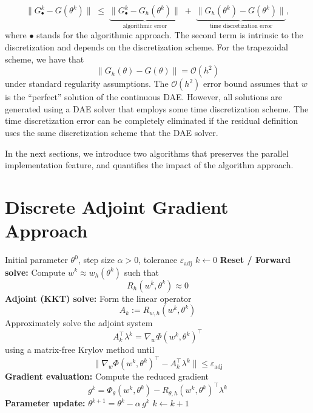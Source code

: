 \[
\|G_\bullet^k - G(\theta^k)\|
\;\le\;
\underbrace{\|G_\bullet^k - G_h(\theta^k)\|}_{\text{algorithmic error}}
\;+\;
\underbrace{\|G_h(\theta^k)-G(\theta^k)\|}_{\text{time discretization error}},
\]
where $\bullet$ stands for the algorithmic approach.
The second term is intrinsic to the discretization and depends on the discretization scheme. For the trapezoidal scheme, we have that 
\[
\|G_h(\theta)-G(\theta)\| = \mathcal{O}(h^2)
\]
under standard regularity assumptions. The $\mathcal{O}(h^2)$ error bound assumes that $w$ is the ``perfect'' solution of the continuous DAE. However, all solutions are generated using a DAE solver that employs some time discretization scheme. The time discretization error can be completely eliminated if the residual definition uses the same discretization scheme that the DAE solver.

In the next sections, we introduce two algorithms that preserves the parallel implementation feature, and quantifies the impact of the algorithm approach.

\section{Discrete Adjoint Gradient Approach}

\begin{algorithm}[htp!]
\caption{Snapshot Discrete Adjoint Gradient (SDAG) Method}
\label{alg:sdadg}
\begin{algorithmic}[1]
\Require Initial parameter $\theta^{0}$, step size $\alpha>0$, tolerance $\varepsilon_{\text{adj}}$
\State $k \leftarrow 0$
    \State \textbf{Reset / Forward solve:}
    \State \quad Compute $w^{k} \approx w_h(\theta^{k})$ such that
    \[
        R_h(w^{k},\theta^{k}) \approx 0
    \]
    \State \textbf{Adjoint (KKT) solve:}
    \State \quad Form the linear operator
    \[
        A_k := R_{w,h}(w^{k},\theta^{k})
    \]
    \State \quad Approximately solve the adjoint system
    \[
        A_k^\top \lambda^{k} = \nabla_w \Phi(w^{k},\theta^{k})^\top
    \]
    using a matrix-free Krylov method until
    \[
        \|\nabla_w \Phi(w^{k},\theta^{k})^\top - A_k^\top \lambda^{k}\| \le \varepsilon_{\text{adj}}
    \]
    \State \textbf{Gradient evaluation:}
    \State \quad Compute the reduced gradient
    \[
        g^{k} = \Phi_\theta(w^{k},\theta^{k})
        - R_{\theta,h}(w^{k},\theta^{k})^\top \lambda^{k}
    \]
    \State \textbf{Parameter update:}
    \State \quad $\theta^{k+1} = \theta^{k} - \alpha\, g^{k}$
    \State $k \leftarrow k+1$
\EndWhile
\end{algorithmic}
\end{algorithm}


